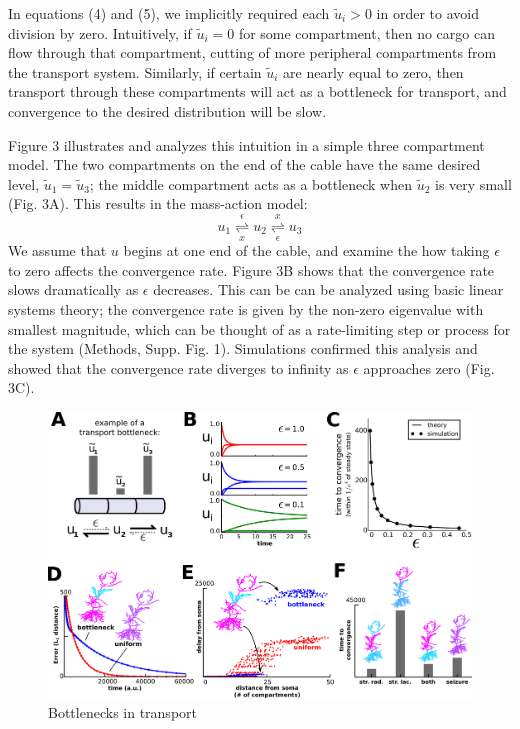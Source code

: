 \documentclass[10pt]{wlpeerj}
\begin{document}
In equations (4) and (5), we implicitly required each $\tilde{u}_i > 0$ in order to avoid division by zero. Intuitively, if $\tilde{u}_i = 0$ for some compartment, then no cargo can flow through that compartment, cutting of more peripheral compartments from the transport system. Similarly, if certain $\tilde{u}_i$ are nearly equal to zero, then transport through these compartments will act as a bottleneck for transport, and convergence to the desired distribution will be slow.

Figure 3 illustrates and analyzes this intuition in a simple three compartment model. The two compartments on the end of the cable have the same desired level, $\tilde{u}_1 = \tilde{u}_3$; the middle compartment acts as a bottleneck when $\tilde{u}_2$ is very small (Fig. 3A). This results in the mass-action model:
\begin{equation}
u_1 \underset{x}{\overset{\epsilon}{\rightleftharpoons}} u_2 \underset{\epsilon}{\overset{x}{\rightleftharpoons}} u_3
\end{equation}
We assume that $u$ begins at one end of the cable, and examine the how taking $\epsilon$ to zero affects the convergence rate. Figure 3B shows that the convergence rate slows dramatically as $\epsilon$ decreases. This can be can be analyzed using basic linear systems theory; the convergence rate is given by the non-zero eigenvalue with smallest magnitude, which can be thought of as a rate-limiting step or process for the system (Methods, Supp. Fig. 1). Simulations confirmed this analysis and showed that the convergence rate diverges to infinity as $\epsilon$ approaches zero (Fig. 3C).

\begin{figure}[!htbp]
\begin{center}
\includegraphics[width=0.9\columnwidth]{03_convergence.png}
\caption{Bottlenecks in transport}
\end{center}
\end{figure}
\end{document}
